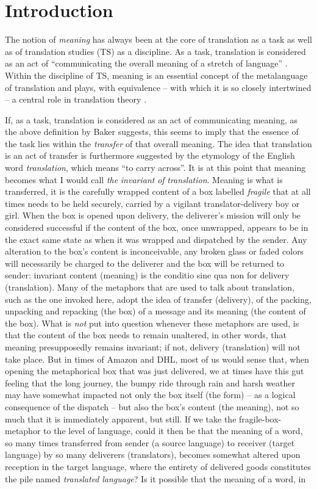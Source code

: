 \chapter{Introduction}
The notion of \textit{meaning} has always been at the core of translation as a task as well as of translation studies (TS) as a discipline. As a task, translation is considered as an act of “communicating the overall meaning of a stretch of language” \citep[10]{baker_other_1992}. Within the discipline of TS, meaning is an essential concept of the metalanguage of translation and plays, with equivalence – with which it is so closely intertwined – a central role in translation theory \citep{halverson_concept_1997}.

If, as a task, translation is considered as an act of communicating meaning, as the above definition by Baker suggests, this seems to imply that the essence of the task lies within the \textit{transfer} of that overall meaning. The idea that translation is an act of transfer is furthermore suggested by the etymology of the English word \textit{translation}, which means “to carry across”. It is at this point that meaning becomes what I would call \textit{the} \textit{invariant} \textit{of} \textit{translation}. Meaning is what is transferred, it is the carefully wrapped content of a box labelled \textit{fragile} that at all times needs to be held securely, carried by a vigilant translator-delivery boy or girl. When the box is opened upon delivery, the deliverer’s mission will only be considered successful if the content of the box, once unwrapped, appears to be in the exact same state as when it was wrapped and dispatched by the sender. Any alteration to the box’s content is inconceivable, any broken glass or faded colors will necessarily be charged to the deliverer and the box will be returned to sender: invariant content (meaning) is the conditio sine qua non for delivery (translation). Many of the metaphors that are used to talk about translation, such as the one invoked here, adopt the idea of transfer (delivery), of the packing, unpacking and repacking (the box) of a message and its meaning (the content of the box). What is \textit{not} put into question whenever these metaphors are used, is that the content of the box needs to remain unaltered, in other words, that meaning presupposedly remains invariant; if not, delivery (translation) will not take place. But in times of Amazon and DHL, most of us would sense that, when opening the metaphorical box that was just delivered, we at times have this gut feeling that the long journey, the bumpy ride through rain and harsh weather may have somewhat impacted not only the box itself (the form) – as a logical consequence of the dispatch – but also the box’s content (the meaning), not so much that it is immediately apparent, but still. If we take the fragile-box-metaphor to the level of language, could it then be that the meaning of a word, so many times transferred from sender (a source language) to receiver (target language) by so many deliverers (translators), becomes somewhat altered upon reception in the target language, where the entirety of delivered goods constitutes the pile named \textit{translated} \textit{language}? Is it possible that the meaning of a word, in 